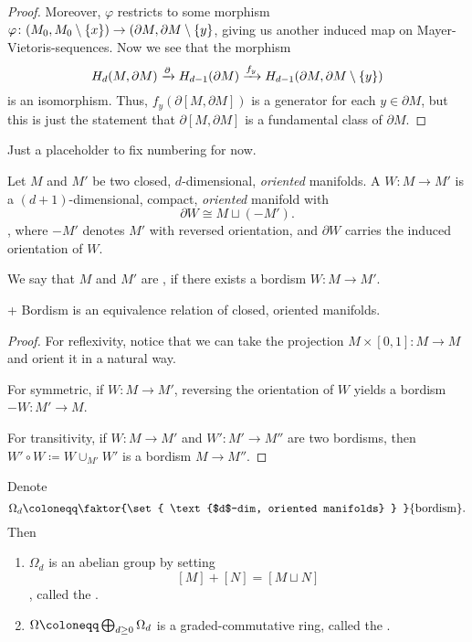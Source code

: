 \begin{proof}
  Moreover, $\varphi $ restricts to some morphism
  $\varphi \colon  (M_0, M_0 \setminus \left\{  x  \right\} )
  \to (\partial M, \partial M \setminus \left\{  y  \right\} $,
  giving us another induced map on Mayer-Vietoris-sequences.
  Now we see that the morphism
  \[
    H_d(M, \partial M) \xrightarrow{\partial }
    H_{d-1}(\partial M)
    \xrightarrow{f_y}
    H_{d-1}(\partial M, \partial M \setminus \left\{  y  \right\} )
  \]
  is an isomorphism.
  Thus, $f_y(\partial [M, \partial M])$ is a generator for each $y\in \partial M$,
  but this is just the statement that $\partial [M, \partial M]$
  is a fundamental class of $\partial M$.
\end{proof}

\begin{editor}
  Just a placeholder to fix numbering for now.
\end{editor}

\begin{definition}[Bordism]
  Let $M$ and $M'$ be two closed, $d$-dimensional,
  \emph{oriented} manifolds.
  A  $W\colon M \to  M'$
  is a $(d+1)$-dimensional, compact, \emph{oriented}
  manifold with
  \[
    \partial W \cong M \sqcup (-M')
  .\],
  where $-M'$ denotes $M'$ with reversed orientation,
  and $\partial W$ carries the induced orientation of $W$.

  We say that $M$ and $M'$ are ,
  if there exists a bordism $W\colon  M \to  M'$.
\end{definition}

\begin{lemma}+
  Bordism is an equivalence relation of closed, oriented manifolds.
\end{lemma}
\begin{proof}
  For reflexivity, notice that we can take
  the projection $M \times [0,1] \colon M \to  M$
  and orient it in a natural way.

  For symmetric, if $W\colon  M \to  M'$,
  reversing the orientation of $W$ yields
  a bordism $-W \colon M' \to  M$.

  For transitivity, if $W\colon M \to  M'$
  and $W' \colon M' \to  M''$ are two bordisms,
  then $W' \circ W \coloneqq W \cup _{M'} W'$
  is a bordism $M \to  M''$.
\end{proof}

\begin{lemma}
  Denote
  \[
    \Omega_d \coloneqq \faktor{\set{ \text{$d$-dim, oriented manifolds} } }{\text{bordism}}
  .\]
  Then
  \begin{enumerate}[h]
    \item $\Omega_d$ is an abelian group by setting
      \[
        [M] + [N] = [M \sqcup N]
      \],
      called the . 
    \item $\Omega \coloneqq  \directsum_{d\geq 0} \Omega_d$
      is a graded-commutative ring, called the
      .
  \end{enumerate}
\end{lemma}
